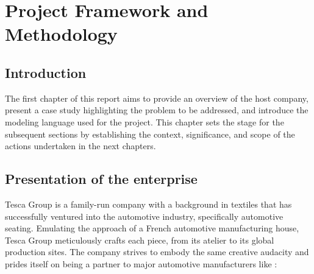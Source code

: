%
%
\chapter{Project Framework and Methodology}
\section{Introduction}
The first chapter of this report aims to provide an overview of the host company, present a case study highlighting the problem to be addressed, and introduce the modeling language used for the project. This chapter sets the stage for the subsequent sections by establishing the context, significance, and scope of the actions undertaken in the next chapters.
\section{Presentation of the  enterprise}
Tesca Group is a family-run company with a background in textiles that has successfully ventured into the automotive industry, specifically automotive seating. Emulating the approach of a French automotive manufacturing house, Tesca Group meticulously crafts each piece, from its atelier to its global production sites. The company strives to embody the same creative audacity and prides itself on being a partner to major automotive manufacturers like : 




